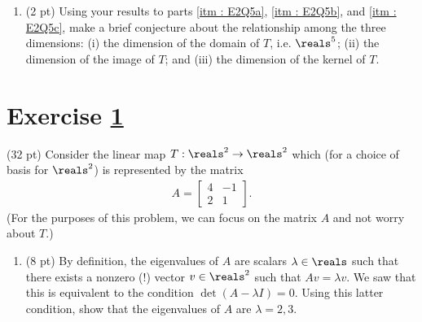 \begin{enumerate}[resume,label=(\alph*)]
\item\label{itm : E2Q5d} (2 pt) Using your results to parts \ref{itm : E2Q5a}, \ref{itm : E2Q5b}, and \ref{itm : E2Q5c}, make a brief conjecture about the relationship among the three dimensions: (i) the dimension of the domain of $T$, i.e. $\reals^{5}$; (ii) the dimension of the image of $T$; and (iii) the dimension of the kernel of $T$.
\end{enumerate}






%
%
%
%


\section{Exercise \ref{sec : Math211 Summer2019 Exam2 Q6}}
\label{sec : Math211 Summer2019 Exam2 Q6}

(32 pt) Consider the linear map $T : \reals^{2} \rightarrow \reals^{2}$ which (for a choice of basis for $\reals^{2}$) is represented by the matrix
\begin{align*}
A
=
\begin{bmatrix}
4	&	-1	\\
2	&	1
\end{bmatrix}%
.
\end{align*}
(For the purposes of this problem, we can focus on the matrix $A$ and not worry about $T$.)
\begin{enumerate}[label=(\alph*)]
\item\label{itm : E2Q6a} (8 pt) By definition, the eigenvalues of $A$ are scalars $\lambda \in \reals$ such that there exists a nonzero (!) vector $v \in \reals^{2}$ such that $A v = \lambda v$. We saw that this is equivalent to the condition $\det(A - \lambda I) = 0$. Using this latter condition, show that the eigenvalues of $A$ are $\lambda = 2,3$.
\end{enumerate}

